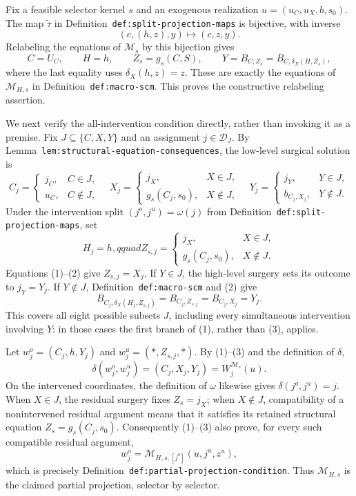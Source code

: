 Fix a feasible selector kernel \(s\) and an exogenous realization \(u=(u_C,u_X,b,s_0)\).  The map \(\widetilde\tau\) in Definition~\texttt{def:split-projection-maps} is bijective, with inverse
\[
(c,(h,z),y)\longmapsto(c,z,y).
\]
Relabeling the equations of \(\mathcal M_s\) by this bijection gives
\[
C=U_C,\qquad H=h,\qquad Z_s=g_s(C,S),
\qquad Y=B_{C,Z_s}=B_{C,\delta_X(H,Z_s)},
\]
where the last equality uses \(\delta_X(h,z)=z\).  These are exactly the equations of \(\mathcal M_{H,s}\) in Definition~\texttt{def:macro-scm}.  This proves the constructive relabeling assertion.

We next verify the all-intervention condition directly, rather than invoking it as a premise.  Fix \(J\subseteq\{C,X,Y\}\) and an assignment \(j\in\mathcal D_J\).  By Lemma~\texttt{lem:structural-equation-consequences}, the low-level surgical solution is
\[
C_j=\begin{cases}j_C,&C\in J,\\u_C,&C\notin J,\end{cases}
\quad
X_j=\begin{cases}j_X,&X\in J,\\g_s(C_j,s_0),&X\notin J,\end{cases}
\quad
Y_j=\begin{cases}j_Y,&Y\in J,\\b_{C_j,X_j},&Y\notin J.\end{cases}
\tag{1}
\]
Under the intervention split \((j^o,j^u)=\omega(j)\) from Definition~\texttt{def:split-projection-maps}, set
\[
H_j=h,qquad
Z_{s,j}=\begin{cases}j_X,&X\in J,\\g_s(C_j,s_0),&X\notin J.\end{cases}
\tag{2}
\]
Equations (1)--(2) give \(Z_{s,j}=X_j\).  If \(Y\in J\), the high-level surgery sets its outcome to \(j_Y=Y_j\).  If \(Y\notin J\), Definition~\texttt{def:macro-scm} and (2) give
\[
B_{C_j,\delta_X(H_j,Z_{s,j})}
=B_{C_j,Z_{s,j}}
=B_{C_j,X_j}
=Y_j.
\tag{3}
\]
This covers all eight possible subsets \(J\), including every simultaneous intervention involving \(Y\): in those cases the first branch of (1), rather than (3), applies.

Let \(w_j^o=(C_j,h,Y_j)\) and \(w_j^u=(\ast,Z_{s,j},\ast)\).  By (1)--(3) and the definition of \(\delta\),
\[
\delta(w_j^o,w_j^u)=(C_j,X_j,Y_j)=W_j^{\mathcal M_s}(u).
\]
On the intervened coordinates, the definition of \(\omega\) likewise gives \(\delta(j^o,j^u)=j\).  When \(X\in J\), the residual surgery fixes \(Z_s=j_X\); when \(X\notin J\), compatibility of a nonintervened residual argument means that it satisfies its retained structural equation \(Z_s=g_s(C_j,s_0)\).  Consequently (1)--(3) also prove, for every such compatible residual argument,
\[
w_j^o=\mathcal M_{H,s,[j^o]}(u,j^u,z^u),
\]
which is precisely Definition~\texttt{def:partial-projection-condition}.  Thus \(\mathcal M_{H,s}\) is the claimed partial projection, selector by selector.

